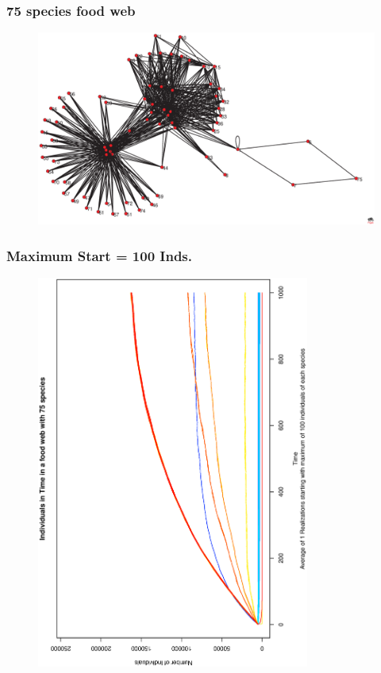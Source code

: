 \documentclass[xcolor=x11names,compress]{beamer}
\renewcommand{\(}{\begin{columns}}
\renewcommand{\)}{\end{columns}}
\newcommand{\<}[1]{\begin{column}{#1}}
\renewcommand{\>}{\end{column}}
\begin{document}
\begin{frame}
\frametitle{75 species food web}
\begin{figure}
\includegraphics[width=1.0\textwidth]{./FoodWeb_75species_Dunne}
\end{figure}
\end{frame}

\begin{frame}
\frametitle{Maximum Start = 100 Inds.}
\begin{figure}
\includegraphics[angle=270,width=0.8\textwidth]{./AverIndInTime_75Dunne_1000}
\end{figure}
\end{frame}
\end{document}
